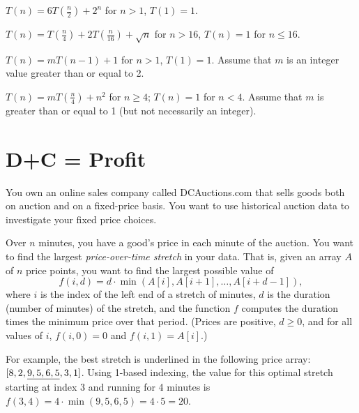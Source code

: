 \documentclass[11pt,fleqn]{exam}
\newif\ifsolutions\solutionsfalse
\begin{document}
\begin{questions}

    \question[3] $T(n) = 6T\left( \frac{n}{2} \right) + 2^n$ for $n > 1$, $T(1) = 1$.

    \ifsolutions\fi 

    \question[3] $T(n) = T\left( \frac{n}{4} \right) + 2T\left( \frac{n}{16} \right) + \sqrt{n}$ for $n > 16$, $T(n) = 1$ for $n \le 16$.

    \ifsolutions\fi 

    \question[4] $T(n) = mT(n-1) + 1$ for $n > 1$, $T(1) = 1$. Assume that $m$ is an integer value greater than or equal to 2.

    \ifsolutions\fi 

    \question[4] $T(n) = mT(\frac{n}{4}) + n^2$ for $n \ge 4$; $T(n) = 1$ for $n < 4$. Assume that $m$ is greater than or equal to 1 (but not necessarily an integer).

    \ifsolutions\fi 

\end{questions}

\clearpage

\section{D+C = Profit}
You own an online sales company called DCAuctions.com that sells goods both on auction and on a fixed-price basis. You want to use historical auction data to investigate your fixed price choices.
	
	Over $n$ minutes, you have a good's price in each minute of the auction. You want to find the largest \textit{price-over-time stretch} in your data. That is, given an array $A$ of $n$ price points, you want to find the largest possible value of
	$$
	f(i,d) = d \cdot \min(A[i], A[i+1], \ldots, A[i+d-1]),
	$$
	where $i$ is the index of the left end of a stretch of minutes, $d$ is the duration (number of minutes) of the stretch, and the function $f$ computes the duration times the minimum price over that period. (Prices are positive, $d \ge 0$, and for all values of $i$, $f(i,0) = 0$ and $f(i,1) = A[i]$.)
	
	For example, the best stretch is underlined in the following price array: $[8, 2, \uline{9, 5, 6, 5}, 3, 1]$. Using 1-based indexing, the value for this optimal stretch starting at index 3 and running for 4 minutes is $f(3,4) = 4 \cdot \min(9,5,6,5) = 4 \cdot 5 = 20$.
\end{document}
